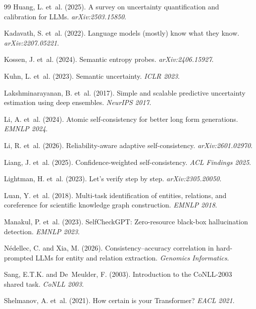 \documentclass[11pt,twocolumn]{article}
\begin{document}
{\begin{thebibliography}{99}
Huang, L. et~al. (2025).
A survey on uncertainty quantification and calibration for LLMs.
\textit{arXiv:2503.15850}.

Kadavath, S. et~al. (2022).
Language models (mostly) know what they know.
\textit{arXiv:2207.05221}.

Kossen, J. et~al. (2024).
Semantic entropy probes.
\textit{arXiv:2406.15927}.

Kuhn, L. et~al. (2023).
Semantic uncertainty.
\textit{ICLR 2023}.

Lakshminarayanan, B. et~al. (2017).
Simple and scalable predictive uncertainty estimation using deep ensembles.
\textit{NeurIPS 2017}.

Li, A. et~al. (2024).
Atomic self-consistency for better long form generations.
\textit{EMNLP 2024}.

Li, R. et~al. (2026).
Reliability-aware adaptive self-consistency.
\textit{arXiv:2601.02970}.

Liang, J. et~al. (2025).
Confidence-weighted self-consistency.
\textit{ACL Findings 2025}.

Lightman, H. et~al. (2023).
Let's verify step by step.
\textit{arXiv:2305.20050}.

Luan, Y. et~al. (2018).
Multi-task identification of entities, relations, and coreference for scientific knowledge graph construction.
\textit{EMNLP 2018}.

Manakul, P. et~al. (2023).
{SelfCheckGPT}: Zero-resource black-box hallucination detection.
\textit{EMNLP 2023}.

N\'{e}dellec, C. and Xia, M. (2026).
Consistency--accuracy correlation in hard-prompted {LLMs} for entity and relation extraction.
\textit{Genomics Informatics}.

Sang, E.T.K. and De~Meulder, F. (2003).
Introduction to the {CoNLL}-2003 shared task.
\textit{CoNLL 2003}.

Shelmanov, A. et~al. (2021).
How certain is your {T}ransformer?
\textit{EACL 2021}.


\end{thebibliography}}
\end{document}
